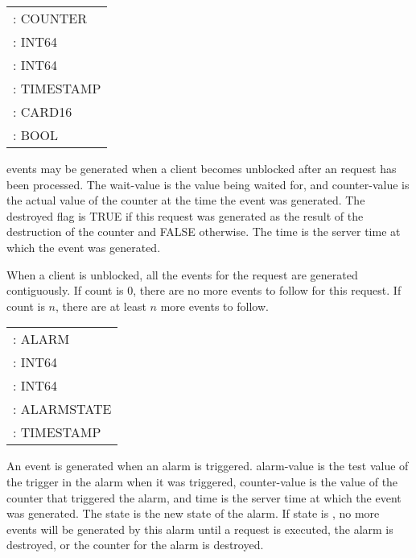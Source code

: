 \begin{description}


\begin{tabular}{l}
	\param{counter}: COUNTER \\
 	\param{wait-value}: INT64 \\
	\param{counter-value}: INT64 \\
 	\param{time}: TIMESTAMP \\
	\param{count}: CARD16 \\
	\param{destroyed}: BOOL
\end{tabular}

 events may be generated when a client becomes unblocked
after an  request has been processed.
The wait-value is the value being waited for, and
counter-value is the actual value of the counter at the time
the event was generated. The
destroyed flag is TRUE if this request was generated as the
result of the destruction of the counter and FALSE otherwise.
The time is the server time at which the event was generated.

When a client is unblocked, all the  events for the
 request are generated contiguously. If
count is 0, there are no more events to follow for this request. If
count is $n$, there are at least $n$ more events to follow.


\begin{tabular}{l}
	\param{alarm}: ALARM \\
 	\param{counter-value}: INT64 \\
	\param{alarm-value}: INT64 \\
 	\param{state}: ALARMSTATE \\
 	\param{time}: TIMESTAMP
\end{tabular}

An  event is generated when an alarm is triggered.
alarm-value is the test value of the trigger in the alarm when it was
triggered, counter-value is the value of the counter that triggered
the alarm, and time is the server time at which the event was
generated. The state is the new state of the alarm. If state is
, no more events will be generated by this alarm until a
 request is executed, the alarm is destroyed, or the
counter for the alarm is destroyed.

\end{description}


